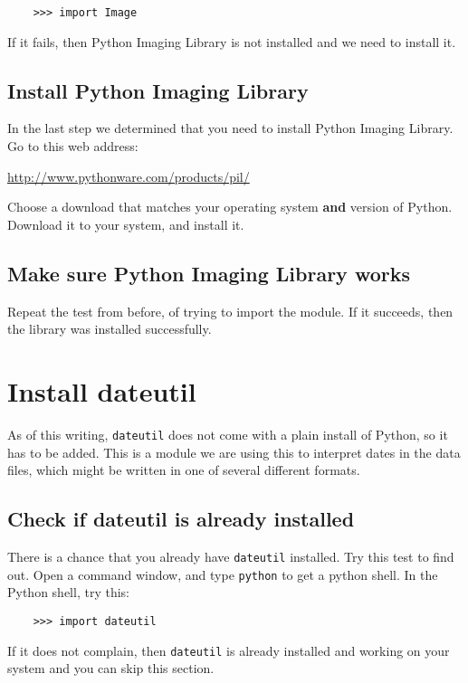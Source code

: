 \begin{verbatim}
    >>> import Image
\end{verbatim}

If it fails, then Python Imaging Library is not installed and we need
to install it.

\subsection{Install Python Imaging Library}

In the last step we determined that you need to install Python Imaging
Library. Go to this web address:

\url{http://www.pythonware.com/products/pil/}

Choose a download that matches your operating system \textbf{and} version of
Python. Download it to your system, and install it.

\subsection{Make sure Python Imaging Library works}

Repeat the test from before, of trying to import the module. If it
succeeds, then the library was installed successfully.


\section{Install dateutil}
\hypertarget{prereq-windows-dateutil}{}

As of this writing, \verb=dateutil= does not come with a plain install
of Python, so it has to be added. This is a module we are using this
to interpret dates in the data files, which might be written in
one of several different formats.

\subsection{Check if dateutil is already installed}

There is a chance that you already have \verb=dateutil= installed. Try
this test to find out. Open a command window, and type \verb=python=
to get a python shell. In the Python shell, try this:

\begin{verbatim}
    >>> import dateutil
\end{verbatim}

If it does not complain, then \verb=dateutil= is already installed and
working on your system and you can skip this section.


